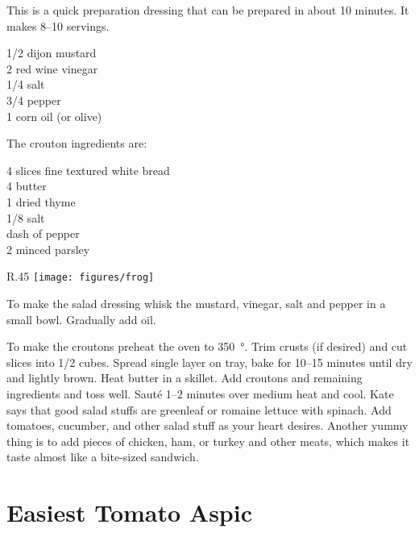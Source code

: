 \begin{open}
  This is a quick preparation dressing that can be prepared in about 10
  minutes.  It makes \numrange{8}{10} servings.
\end{open}
\begin{ingredients}
  \SI{1/2}{\cup} dijon mustard \\
  \SI{2}{\tblspoon} red wine vinegar \\
  \SI{1/4}{\teaspoon} salt \\
  \SI{3/4}{\teaspoon} pepper \\
  \SI{1}{\cup} corn oil (or olive)
\end{ingredients}
The crouton ingredients are:
\begin{ingredients}
  4 slices fine textured white bread \\
  \SI{4}{\tblspoon}  butter \\
  \SI{1}{\teaspoon} dried thyme \\
  \SI{1/8}{\teaspoon} salt \\
  dash of pepper \\
  \SI{2}{\teaspoon} minced parsley
\end{ingredients}
\begin{wrapfigure}{R}{.45\textwidth}
\centering\texttt{[image: figures/frog]}
\end{wrapfigure}
To make the salad dressing whisk the mustard, vinegar, salt and pepper in a
small bowl.  Gradually add oil.

To make the croutons preheat the oven to \SI{350}{\degree}.  Trim crusts (if
desired) and cut slices into \SI{1/2}{\inch} cubes.  Spread single layer on
tray, bake for \numrange{10}{15} minutes until dry and lightly brown.  Heat
butter in a skillet.  Add croutons and remaining ingredients and toss well.
Saut\'{e} \numrange{1}{2} minutes over medium heat and cool.  Kate says that
good salad stuffs are greenleaf or romaine lettuce with spinach.  Add tomatoes,
cucumber, and other salad stuff as your heart desires.  Another yummy thing is
to add pieces of chicken, ham, or turkey and other meats, which makes it taste
almost like a bite-sized sandwich.

\section{Easiest Tomato Aspic}

